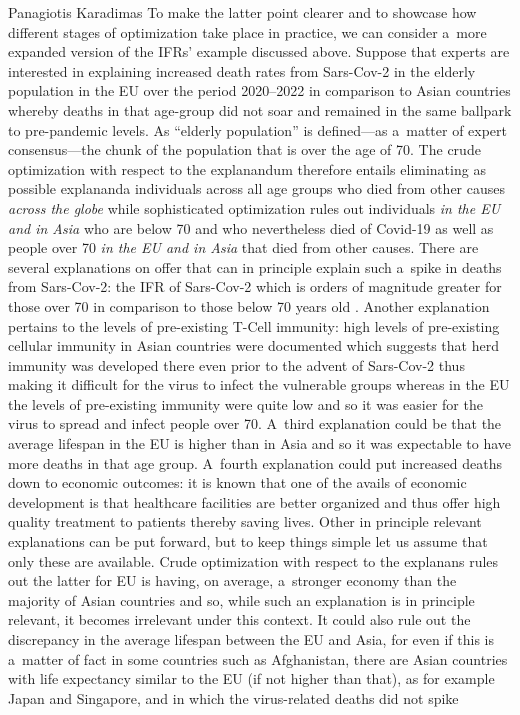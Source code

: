 \begin{artengenv}{Panagiotis Karadimas}
To make the latter point clearer and to showcase how different stages of optimization take place in practice, we can consider a~more expanded version of the IFRs' example discussed above. Suppose that experts are interested in explaining increased death rates from Sars-Cov-2 in the elderly population in the EU over the period 2020--2022 in comparison to Asian countries whereby deaths in that age-group did not soar and remained in the same ballpark to pre-pandemic levels. As ``elderly population'' is defined---as a~matter of expert consensus---the chunk of the population that is over the age of 70. The crude optimization with respect to the explanandum therefore entails eliminating as possible explananda individuals across all age groups who died from other causes \textit{across the globe} while sophisticated optimization rules out individuals \textit{in the EU and in Asia} who are below 70 and who nevertheless died of Covid-19 as well as people over 70 \textit{in the EU and in Asia} that died from other causes. There are several explanations on offer that can in principle explain such a~spike in deaths from Sars-Cov-2: the IFR of Sars-Cov-2 which is orders of magnitude greater for those over 70 in comparison to those below 70 years old
\parencite[][]{axfors_infection_2022}. %
 Another explanation pertains to the levels of pre-existing T-Cell immunity: high levels of pre-existing cellular immunity in Asian countries were documented 
\parencite[][]{bolourian_covid-19_2021} %
 which suggests that herd immunity was developed there even prior to the advent of Sars-Cov-2 
\parencite[][]{le_bert_highly_2021} %
 thus making it difficult for the virus to infect the vulnerable groups whereas in the EU the levels of pre-existing immunity were quite low and so it was easier for the virus to spread and infect people over 70. A~third explanation could be that the average lifespan in the EU is higher than in Asia and so it was expectable to have more deaths in that age group. A~fourth explanation could put increased deaths down to economic outcomes: it is known that one of the avails of economic development is that healthcare facilities are better organized and thus offer high quality treatment to patients thereby saving lives. Other in principle relevant explanations can be put forward, but to keep things simple let us assume that only these are available. Crude optimization with respect to the explanans rules out the latter for EU is having, on average, a~stronger economy than the majority of Asian countries and so, while such an explanation is in principle relevant, it becomes irrelevant under this context. It could also rule out the discrepancy in the average lifespan between the EU and Asia, for even if this is a~matter of fact in some countries such as Afghanistan, there are Asian countries with life expectancy similar to the EU (if not higher than that), as for example Japan and Singapore, and in which the virus-related deaths did not spike 

\end{artengenv}
